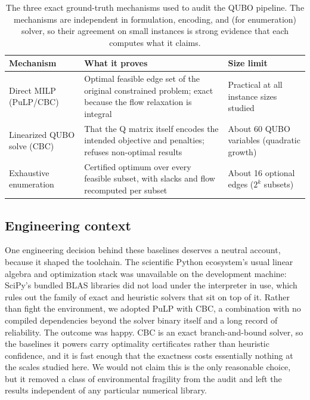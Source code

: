 \begin{table}[htbp]
  \centering
  \caption{The three exact ground-truth mechanisms used to audit the QUBO
  pipeline. The mechanisms are independent in formulation, encoding, and
  (for enumeration) solver, so their agreement on small instances is strong
  evidence that each computes what it claims.}
  \label{tab:groundtruth}
  \begin{tabular}{@{}lp{4.6cm}p{3.4cm}@{}}
    \toprule
    \textbf{Mechanism} & \textbf{What it proves} & \textbf{Size limit} \\
    \midrule
    Direct MILP (PuLP/CBC)
      & Optimal feasible edge set of the original constrained problem;
        exact because the flow relaxation is integral
      & Practical at all instance sizes studied \\
    \addlinespace
    Linearized QUBO solve (CBC)
      & That the Q matrix itself encodes the intended objective and
        penalties; refuses non-optimal results
      & About 60 QUBO variables (quadratic growth) \\
    \addlinespace
    Exhaustive enumeration
      & Certified optimum over every feasible subset, with slacks and flow
        recomputed per subset
      & About 16 optional edges ($2^k$ subsets) \\
    \bottomrule
  \end{tabular}
\end{table}

\subsection{Engineering context}

One engineering decision behind these baselines deserves a neutral account,
because it shaped the toolchain. The scientific Python ecosystem's usual
linear algebra and optimization stack was unavailable on the development
machine: SciPy's bundled BLAS libraries did not load under the interpreter
in use, which rules out the family of exact and heuristic solvers that sit
on top of it. Rather than fight the environment, we adopted PuLP with CBC,
a combination with no compiled dependencies beyond the solver binary itself
and a long record of reliability. The outcome was happy. CBC is an exact
branch-and-bound solver, so the baselines it powers carry optimality
certificates rather than heuristic confidence, and it is fast enough that
the exactness costs essentially nothing at the scales studied here. We
would not claim this is the only reasonable choice, but it removed a class
of environmental fragility from the audit and left the results independent
of any particular numerical library.

